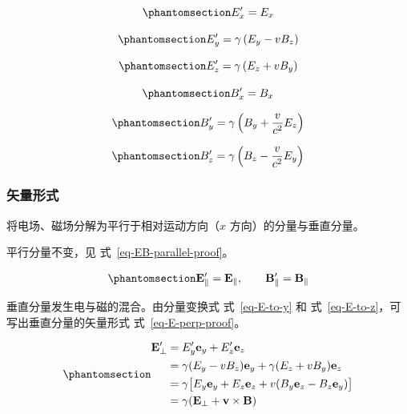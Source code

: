 \documentclass[
  chinese,
  a4paper,
  UTF8,
  12pt,
  oneside,
  openany]{ctexbook}
\theoremstyle{plain}
\theoremstyle{plain}
\theoremstyle{plain}
\theoremstyle{definition}
\theoremstyle{plain}
\theoremstyle{plain}
\theoremstyle{remark}
\begin{document}
\begin{equation}\protect\phantomsection\label{eq-E-to-x}{
E'_x = E_x
}\end{equation}

\begin{equation}\protect\phantomsection\label{eq-E-to-y}{
E'_y = \gamma\left(E_y - v B_z \right)
}\end{equation}

\begin{equation}\protect\phantomsection\label{eq-E-to-z}{
E'_z = \gamma\left(E_z + v B_y \right)
}\end{equation}

\begin{equation}\protect\phantomsection\label{eq-B-to-x}{
B'_x = B_x
}\end{equation}

\begin{equation}\protect\phantomsection\label{eq-B-to-y}{
B'_y = \gamma\left(B_y + \frac{v}{c^{2}} E_z \right)
}\end{equation}

\begin{equation}\protect\phantomsection\label{eq-B-to-z}{
B'_z = \gamma\left(B_z - \frac{v}{c^{2}} E_y \right)
}\end{equation}

\subsubsection{矢量形式}\label{ux77e2ux91cfux5f62ux5f0f}

将电场、磁场分解为平行于相对运动方向（\(x\) 方向）的分量与垂直分量。

平行分量不变，见 式~\ref{eq-EB-parallel-proof}。

\begin{equation}\protect\phantomsection\label{eq-EB-parallel-proof}{
\mathbf{E}'_\parallel = \mathbf{E}_\parallel, \qquad \mathbf{B}'_\parallel = \mathbf{B}_\parallel
}\end{equation}

垂直分量发生电与磁的混合。由分量变换式 式~\ref{eq-E-to-y} 和
式~\ref{eq-E-to-z}，可写出垂直分量的矢量形式 式~\ref{eq-E-perp-proof}。

\begin{equation}\protect\phantomsection\label{eq-E-perp-proof}{
\begin{aligned}
\mathbf{E}'_\perp
&= E'_y \mathbf{e}_y + E'_z \mathbf{e}_z \\
&= \gamma(E_y - vB_z)\mathbf{e}_y + \gamma(E_z + vB_y)\mathbf{e}_z \\
&= \gamma\bigl[ E_y \mathbf{e}_y + E_z \mathbf{e}_z + v(B_y \mathbf{e}_z - B_z \mathbf{e}_y) \bigr] \\
&= \gamma(\mathbf{E}_\perp + \mathbf{v} \times \mathbf{B})
\end{aligned}
}\end{equation}
\end{document}
